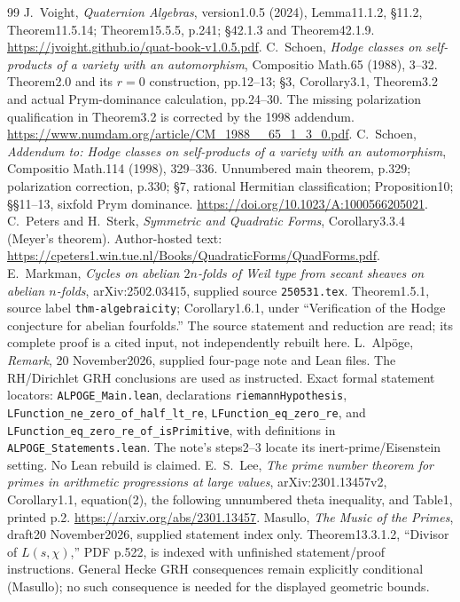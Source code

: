 \begin{thebibliography}{99}
 J.~Voight, \emph{Quaternion Algebras}, version1.0.5 (2024), Lemma11.1.2, \S11.2, Theorem11.5.14; Theorem15.5.5, p.241; \S42.1.3 and Theorem42.1.9. \url{https://jvoight.github.io/quat-book-v1.0.5.pdf}.
 C.~Schoen, \emph{Hodge classes on self-products of a variety with an automorphism}, Compositio Math.65 (1988), 3--32. Theorem2.0 and its $r=0$ construction, pp.12--13; \S3, Corollary3.1, Theorem3.2 and actual Prym-dominance calculation, pp.24--30. The missing polarization qualification in Theorem3.2 is corrected by the 1998 addendum. \url{https://www.numdam.org/article/CM_1988__65_1_3_0.pdf}.
 C.~Schoen, \emph{Addendum to: Hodge classes on self-products of a variety with an automorphism}, Compositio Math.114 (1998), 329--336. Unnumbered main theorem, p.329; polarization correction, p.330; \S7, rational Hermitian classification; Proposition10; \S\S11--13, sixfold Prym dominance. \url{https://doi.org/10.1023/A:1000566205021}.
 C.~Peters and H.~Sterk, \emph{Symmetric and Quadratic Forms}, Corollary3.3.4 (Meyer's theorem). Author-hosted text: \url{https://cpeters1.win.tue.nl/Books/QuadraticForms/QuadForms.pdf}.
 E.~Markman, \emph{Cycles on abelian $2n$-folds of Weil type from secant sheaves on abelian $n$-folds}, arXiv:2502.03415, supplied source \texttt{250531.tex}. Theorem1.5.1, source label \texttt{thm-algebraicity}; Corollary1.6.1, under ``Verification of the Hodge conjecture for abelian fourfolds.'' The source statement and reduction are read; its complete proof is a cited input, not independently rebuilt here.
 L.~Alp\"oge, \emph{Remark}, 20 November2026, supplied four-page note and Lean files. The RH/Dirichlet GRH conclusions are used as instructed. Exact formal statement locators: \texttt{ALPOGE\_Main.lean}, declarations \texttt{riemannHypothesis}, \texttt{LFunction\_ne\_zero\_of\_half\_lt\_re}, \texttt{LFunction\_eq\_zero\_re}, and \texttt{LFunction\_eq\_zero\_re\_of\_isPrimitive}, with definitions in \texttt{ALPOGE\_Statements.lean}. The note's steps2--3 locate its inert-prime/Eisenstein setting. No Lean rebuild is claimed.
 E.~S.~Lee, \emph{The prime number theorem for primes in arithmetic progressions at large values}, arXiv:2301.13457v2, Corollary1.1, equation(2), the following unnumbered theta inequality, and Table1, printed p.2. \url{https://arxiv.org/abs/2301.13457}.
 Masullo, \emph{The Music of the Primes}, draft20 November2026, supplied statement index only. Theorem13.3.1.2, ``Divisor of $L(s,\chi)$,'' PDF p.522, is indexed with unfinished statement/proof instructions. General Hecke GRH consequences remain explicitly conditional (Masullo); no such consequence is needed for the displayed geometric bounds.

\end{thebibliography}
